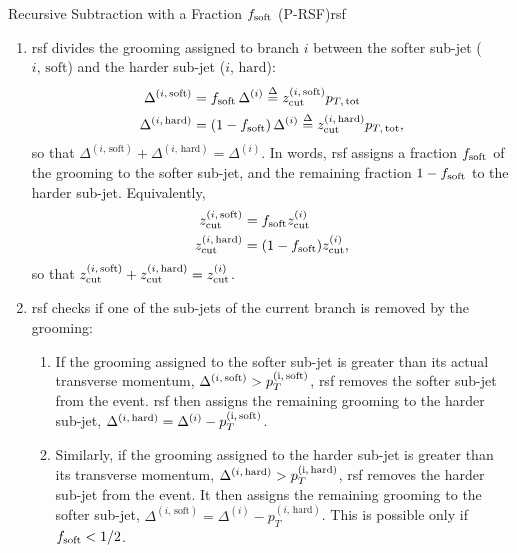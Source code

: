 \begin{definitionbox}{Recursive Subtraction with a Fraction \(f_{\rm soft}\) (P-RSF)}{rsf}
\begin{enumerate}
        \item
        \gls{rsf} divides the grooming assigned to branch \(i\) between the softer sub-jet (\(i,\,\text{soft}\)) and the harder sub-jet (\(i,\,\text{hard}\)):
        \begin{subequations}
        \begin{align}
            \Delta^{(i,\,\text{soft})}
        &=
        f_{\rm soft} \, \Delta^{(i)}
        \overset{\Delta}{=}
        z_{\rm cut}^{(i,\,\text{soft})} p_{T,\, \rm tot}
        \\
            \Delta^{(i,\,\text{hard})}
        &=
        (1-f_{\rm soft}) \, \Delta^{(i)}
        \overset{\Delta}{=}
        z_{\rm cut}^{(i,\,\text{hard})} p_{T,\, \rm tot}
            ,
        \end{align}
        \end{subequations}
        so that \(\Delta^{(i,\,\text{soft})} + \Delta^{(i,\,\text{hard})} = \Delta^{(i)}\).
        In words, \gls{rsf} assigns a fraction \(f_{\rm soft}\) of the grooming to the softer sub-jet, and the remaining fraction \(1 - f_{\rm soft}\) to the harder sub-jet.
        Equivalently,
        \begin{subequations}
        \begin{align}
            z_{\rm cut}^{(i,\,\text{soft})} &= f_{\rm soft} z_{\rm cut}^{(i)}
            \\
            z_{\rm cut}^{(i,\,\text{hard})} &= (1-f_{\rm soft}) z_{\rm cut}^{(i)}
            ,
        \end{align}
        \end{subequations}
        so that \(z_{\rm cut}^{(i,\,\text{soft})} + z_{\rm cut}^{(i,\,\text{hard})} = z_{\rm cut}^{(i)}\).
        \label{item:rsf_softhard}

        \item
        \gls{rsf} checks if one of the sub-jets of the current branch is removed by the grooming:

        \begin{enumerate}
        \item
        If the grooming assigned to the softer sub-jet is greater than its actual transverse momentum, \(\Delta^{(i,\,\text{soft})} > p_T^{(\rm i,\,\text{soft})}\), \gls{rsf} removes the softer sub-jet from the event.
        \gls{rsf} then assigns the remaining grooming to the harder sub-jet, \(\Delta^{(i,\,\text{hard})} = \Delta^{(i)} - p_T^{(\rm i,\,\text{soft})}\).
        \label{item:remove_soft}

        \item
        Similarly, if the grooming assigned to the harder sub-jet is greater than its transverse momentum, \(\Delta^{(i,\,\text{hard})} > p_T^{(\rm i,\,\text{hard})}\), \gls{rsf} removes the harder sub-jet from the event.
        It then assigns the remaining grooming to the softer sub-jet, \(\Delta^{(i,\,\text{soft})} = \Delta^{(i)} - p_{T}^{(i,\,\text{hard})}\).
        This is possible only if \(f_{\rm soft} < 1/2\).
        \label{item:remove_hard}
        \end{enumerate}


\end{enumerate}
\end{definitionbox}
